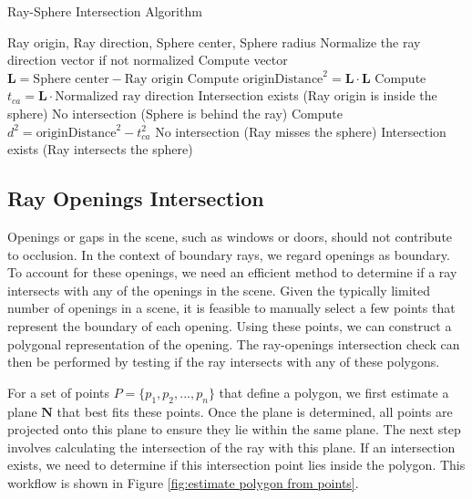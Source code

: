 \documentclass[11pt, a4paper,oneside,chapterprefix=false]{scrbook}
\begin{document}
\begin{algorithm}[H]
\caption{Ray-Sphere Intersection Algorithm}
\begin{algorithmic}[1]
\Require Ray origin, Ray direction, Sphere center, Sphere radius
\State Normalize the ray direction vector if not normalized
\State Compute vector \( \mathbf{L} = \text{Sphere center} - \text{Ray origin} \)
\State Compute \( \text{originDistance}^2 = \mathbf{L} \cdot \mathbf{L} \)
\State Compute \( t_{ca} = \mathbf{L} \cdot \text{Normalized ray direction} \)
    \State \Return Intersection exists (Ray origin is inside the sphere)
\EndIf
{}
    \State \Return No intersection (Sphere is behind the ray)
\EndIf
\State Compute \( d^2 = \text{originDistance}^2 - t_{ca}^2 \)
    \State \Return No intersection (Ray misses the sphere)
\Else
    \State \Return Intersection exists (Ray intersects the sphere)
\EndIf
\end{algorithmic}
\end{algorithm}


\subsection{Ray Openings Intersection}

Openings or gaps in the scene, such as windows or doors, should not contribute to occlusion. In the context of boundary rays, we regard openings as boundary. To account for these openings, we need an efficient method to determine if a ray intersects with any of the openings in the scene. Given the typically limited number of openings in a scene, it is feasible to manually select a few points that represent the boundary of each opening. Using these points, we can construct a polygonal representation of the opening. The ray-openings intersection check can then be performed by testing if the ray intersects with any of these polygons.

\vspace{10pt}

For a set of points \( P = \{p_1, p_2, ..., p_n\} \) that define a polygon, we first estimate a plane \( \mathbf{N} \) that best fits these points. Once the plane is determined, all points are projected onto this plane to ensure they lie within the same plane. The next step involves calculating the intersection of the ray with this plane. If an intersection exists, we need to determine if this intersection point lies inside the polygon. This workflow is shown in Figure \ref{fig:estimate polygon from points}.
\end{document}
